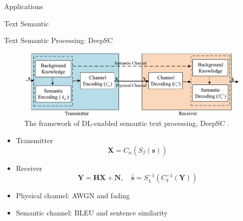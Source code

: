 \documentclass[presentation,mathserif,9pt]{beamer}
\begin{document}
\begin{section}{Applications}
\begin{subsection}{Text Semantic}
		\begin{frame}{Text Semantic Processing: DeepSC}
			\begin{figure}
				\includegraphics[width=\textwidth]{assets/deepsc.jpg}
				\caption{The framework of DL-enabled semantic text processing, DeepSC \cite{Xie2021a}.}
			\end{figure}
			\begin{itemize}
				\item Transmitter
				\begin{equation}
					\boldsymbol{X} = C_{\alpha}(S_{\beta}(\boldsymbol{{s}}))
				\end{equation}
				\item Receiver
				\begin{equation}
					\boldsymbol{Y} = \boldsymbol{H} \boldsymbol{X} + \boldsymbol{N}, \quad \hat{\boldsymbol{s}} = S_{\chi}^{-1}(C_{\delta}^{-1}(\boldsymbol{Y}))
				\end{equation}
				\item Physical channel: AWGN and fading
				\item Semantic channel: BLEU and sentence similarity
			\end{itemize}
		\end{frame}


\end{subsection}
\end{section}
\end{document}

